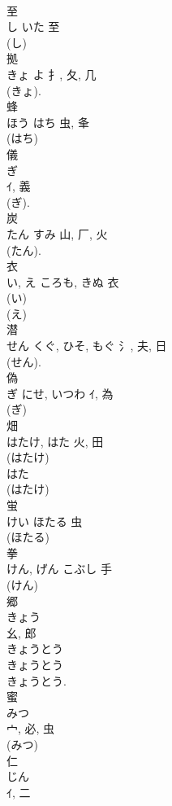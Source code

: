 \documentclass[8pt]{extreport}
\begin{document}
\begin{CJK}{UTF8}{min}
\\	至	
\\	し	いた	至	
\\	(し) 
\\	拠	
\\	きょ	よ	扌, 夂, 几	
\\	(きょ). 
\\	蜂	
\\	ほう	はち	虫, 夆	
\\	(はち) 
\\	儀	
\\	ぎ	
\\	ｲ, 義	
\\	(ぎ).	
\\	炭	
\\	たん	すみ	山, 厂, 火	
\\	(たん). 
\\	衣	
\\	い, え	ころも, きぬ	衣	
\\	(い) 
\\	(え) 
\\	潜	
\\	せん	くぐ, ひそ, もぐ	氵, 夫, 日	
\\	(せん). 
\\	偽	
\\	ぎ	にせ, いつわ	ｲ, 為	
\\	(ぎ) 
\\	畑	
\\	はたけ, はた	火, 田	
\\	(はたけ) 
\\	はた 
\\	(はたけ) 
\\	蛍	
\\	けい	ほたる	虫		
\\	(ほたる) 
\\	拳	
\\	けん, げん	こぶし	手		
\\	(けん) 
\\	郷	
\\	きょう	
\\	幺, 郎	
\\	きょうとう 
\\	きょうとう 
\\	きょうとう. 
\\	蜜	
\\	みつ	
\\	宀, 必, 虫	
\\	(みつ) 
\\	仁	
\\	じん	
\\	ｲ, 二	

\end{CJK}
\end{document}
